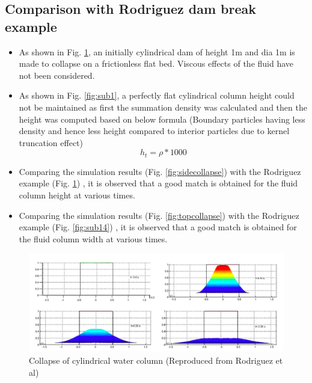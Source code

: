 \documentclass{article}
\begin{document}
\subsection{Comparison with Rodriguez dam break example}
\begin{itemize}
\item As shown in Fig. \ref{fig:sub13}, an initially cylindrical dam of
height 1m and dia 1m is made to collapse on a frictionless flat bed. Viscous
effects of the fluid have not been considered.
\item As shown in Fig. \ref{fig:sub1}, a perfectly flat cylindrical column height
could not be maintained as first the summation density was calculated and
then the height was computed based on below formula (Boundary particles having less density
and hence less height compared to interior particles due to kernel truncation effect)
\begin{equation}
h_t = \rho * 1000
\label{}
\end{equation}
\item Comparing the simulation results (Fig. \ref{fig:sidecollapse})  with the Rodriguez example (Fig. \ref{fig:sub13}) , it is observed that a good 
match is obtained for the fluid column height at various times.
\item Comparing the simulation results (Fig. \ref{fig:topcollapse})  with the Rodriguez example (Fig. \ref{fig:sub14}) , it is observed that a good 
match is obtained for the fluid column width at various times.
\end{itemize}
\begin{figure}[!htbp]
  \centering
  \includegraphics[width=1.1\linewidth]{rodri.png}
  \caption{Collapse of cylindrical water column (Reproduced from Rodriguez et al)}
  \label{fig:sub13}
\end{figure}
\end{document}
